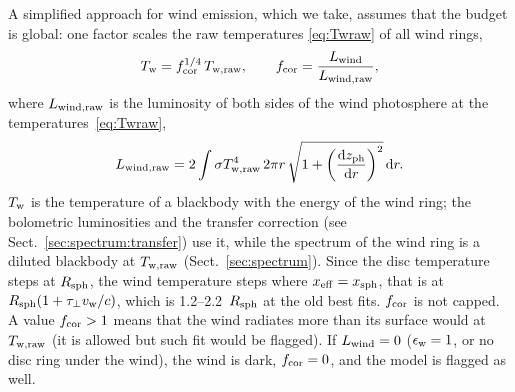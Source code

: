 A simplified approach for wind emission, which we take, assumes that the budget is global: one factor scales the raw temperatures \eqref{eq:Twraw} of all wind rings,
\begin{equation}
T_{\rm w} = f_{\rm cor}^{1/4}\,T_{\rm w,raw}, \qquad f_{\rm cor} = \frac{L_{\rm wind}}{L_{\rm wind,raw}} ,
\label{eq:fcor}
\end{equation}
where $L_{\rm wind,raw}$ is the luminosity of both sides of the wind photosphere at the temperatures~\eqref{eq:Twraw},
\begin{equation}
L_{\rm wind,raw} = 2\int \sigma T_{\rm w,raw}^4\,2\pi r\,\sqrt{1 + \left(\frac{{\rm d}z_{\rm ph}}{{\rm d}r}\right)^2}\,{\rm d}r .
\label{eq:Lwindraw}
\end{equation}
$T_{\rm w}$ is the temperature of a blackbody with the energy of the wind ring; the bolometric luminosities and the transfer correction (see Sect.~\ref{sec:spectrum:transfer}) use it, while the spectrum of the wind ring is a diluted blackbody at $T_{\rm w,raw}$ (Sect.~\ref{sec:spectrum}).
Since the disc temperature steps at $R_{\rm sph}$, the wind temperature steps where $x_{\rm eff} = x_{\rm sph}$, that is at $R_{\rm sph}(1 + \tau_\perp v_{\rm w}/c)$, which is 1.2--2.2~$R_{\rm sph}$ at the old best fits.
$f_{\rm cor}$ is not capped.
A value $f_{\rm cor} > 1$ means that the wind radiates more than its surface would at $T_{\rm w,raw}$ (it is allowed but such fit would be flagged).
If $L_{\rm wind} = 0$ ($\epsilon_{\rm w} = 1$, or no disc ring under the wind), the wind is dark, $f_{\rm cor} = 0$, and the model is flagged as well.

